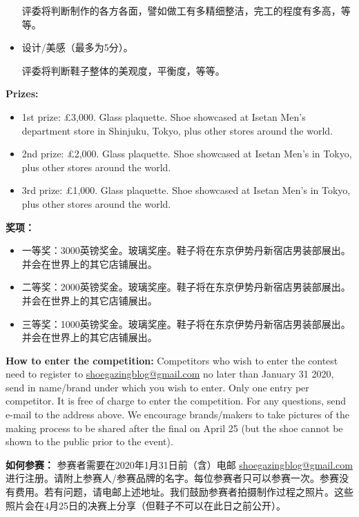 \begin{paracol}{2}
\begin{itemize}
            评委将判断制作的各方各面，譬如做工有多精细整洁，完工的程度有多高，等等。

            \item 设计/美感（最多为5分）。

            评委将判断鞋子整体的美观度，平衡度，等等。
        \end{itemize}
        \switchcolumn*

        \textbf{Prizes:}
        \begin{itemize}
            \item 1st prize: £3,000. Glass plaquette. Shoe showcased at Isetan Men’s department store in Shinjuku, Tokyo, plus other stores around the world.
            \item 2nd prize: £2,000. Glass plaquette. Shoe showcased at Isetan Men’s in Tokyo, plus other stores around the world.
            \item 3rd prize: £1,000. Glass plaquette. Shoe showcased at Isetan Men’s in Tokyo, plus other stores around the world.
        \end{itemize}

        \vspace{1em}

        \switchcolumn
        \textbf{奖项：}
        \begin{itemize}
            \item 一等奖：3000英镑奖金。玻璃奖座。鞋子将在东京伊势丹新宿店男装部展出。并会在世界上的其它店铺展出。
            \item 二等奖：2000英镑奖金。玻璃奖座。鞋子将在东京伊势丹新宿店男装部展出。并会在世界上的其它店铺展出。
            \item 三等奖：1000英镑奖金。玻璃奖座。鞋子将在东京伊势丹新宿店男装部展出。并会在世界上的其它店铺展出。
        \end{itemize}
        \switchcolumn*

        \textbf{How to enter the competition:}
        Competitors who wish to enter the contest need to register to \href{mailto:shoegazingblog@gmail.com}{shoegazingblog@gmail.com} no later than January 31 2020, send in name/brand under which you wish to enter. Only one entry per competitor. It is free of charge to enter the competition. For any questions, send e-mail to the address above. We encourage brands/makers to take pictures of the making process to be shared after the final on April 25 (but the shoe cannot be shown to the public prior to the event).

        \switchcolumn
        \textbf{如何参赛：}
        参赛者需要在2020年1月31日前（含）电邮
        \href{mailto:shoegazingblog@gmail.com}{shoegazingblog@gmail.com}进行注册。请附上参赛人/参赛品牌的名字。每位参赛者只可以参赛一次。参赛没有费用。若有问题，请电邮上述地址。我们鼓励参赛者拍摄制作过程之照片。这些照片会在4月25日的决赛上分享（但鞋子不可以在此日之前公开）。
        \switchcolumn*


\end{paracol}
